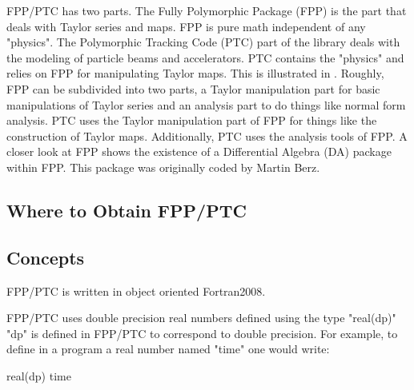 \documentclass[english,12pt,article]{article} %
\begin{document}
FPP/PTC has two parts. The Fully Polymorphic Package (FPP) is the part that deals with Taylor series and maps. FPP is pure math independent of any "physics". The Polymorphic Tracking Code (PTC) part of the library deals with the modeling of particle beams and accelerators. PTC contains the "physics" and relies on FPP for manipulating Taylor maps. This is illustrated in . Roughly, FPP can be subdivided into two parts, a Taylor manipulation part for basic manipulations of Taylor series and an analysis part to do things like normal form analysis. PTC uses the Taylor manipulation part of FPP for things like the construction of Taylor maps. Additionally, PTC uses the analysis tools of FPP. A closer look at FPP shows the existence of a Differential Algebra (DA) package within FPP. This package was originally coded by Martin Berz.

\subsection{Where to Obtain FPP/PTC}

\subsection{Concepts}

FPP/PTC is written in object oriented Fortran2008. 

FPP/PTC uses double precision real numbers defined using the type "real(dp)" "dp" is defined in FPP/PTC to correspond to double precision. For example, to define in a program a real number named "time" one would write:
\begin{example}
  real(dp) time
\end{example}
\end{document}
